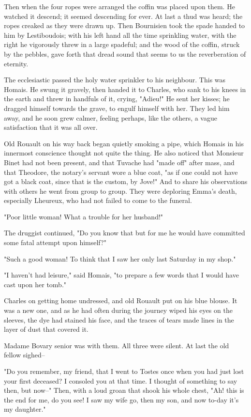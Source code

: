 \documentclass{tufte-book}
\begin{document}
Then when the four ropes were arranged the coffin was placed upon them.
He watched it descend; it seemed descending for ever. At last a thud was
heard; the ropes creaked as they were drawn up. Then Bournisien took
the spade handed to him by Lestiboudois; with his left hand all the
time sprinkling water, with the right he vigorously threw in a large
spadeful; and the wood of the coffin, struck by the pebbles, gave forth
that dread sound that seems to us the reverberation of eternity.

The ecclesiastic passed the holy water sprinkler to his neighbour. This
was Homais. He swung it gravely, then handed it to Charles, who sank to
his knees in the earth and threw in handfuls of it, crying, "Adieu!" He
sent her kisses; he dragged himself towards the grave, to engulf himself
with her. They led him away, and he soon grew calmer, feeling perhaps,
like the others, a vague satisfaction that it was all over.

Old Rouault on his way back began quietly smoking a pipe, which Homais
in his innermost conscience thought not quite the thing. He also noticed
that Monsieur Binet had not been present, and that Tuvache had "made
off" after mass, and that Theodore, the notary's servant wore a blue
coat, "as if one could not have got a black coat, since that is the
custom, by Jove!" And to share his observations with others he went from
group to group. They were deploring Emma's death, especially Lheureux,
who had not failed to come to the funeral.

"Poor little woman! What a trouble for her husband!"

The druggist continued, "Do you know that but for me he would have
committed some fatal attempt upon himself?"

"Such a good woman! To think that I saw her only last Saturday in my
shop."

"I haven't had leisure," said Homais, "to prepare a few words that I
would have cast upon her tomb."

Charles on getting home undressed, and old Rouault put on his blue
blouse. It was a new one, and as he had often during the journey wiped
his eyes on the sleeves, the dye had stained his face, and the traces of
tears made lines in the layer of dust that covered it.

Madame Bovary senior was with them. All three were silent. At last the
old fellow sighed--

"Do you remember, my friend, that I went to Tostes once when you had
just lost your first deceased? I consoled you at that time. I thought of
something to say then, but now--" Then, with a loud groan that shook his
whole chest, "Ah! this is the end for me, do you see! I saw my wife go,
then my son, and now to-day it's my daughter."
\end{document}
